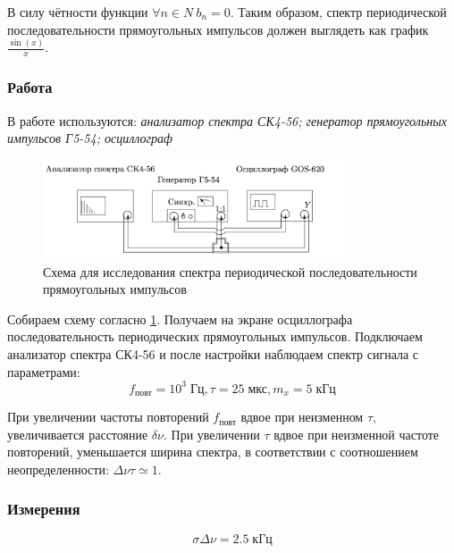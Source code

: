\documentclass[a4paper, 12pt]{article}
\begin{document}
В силу чётности функции $\forall n \in {N} \ b_n=0$. Таким образом, спектр периодической последовательности прямоугольных импульсов должен выглядеть как график $\frac{\sin(x)}{x}$.
\subsubsection*{Работа}
В работе используются: \textit{анализатор спектра СК4-56; генератор прямоугольных импульсов Г5-54; осциллограф}



\begin{figure}[H]
\centering
\includegraphics[width = 0.8\textwidth]{schemeA}
\caption{Схема для исследования спектра периодической последовательности прямоугольных импульсов}
\label{img:scheme A}
\end{figure}

Собираем схему согласно \ref{img:scheme A}. Получаем на экране осциллографа последовательность периодических прямоугольных импульсов. Подключаем анализатор спектра СК4-56 и после настройки наблюдаем спектр сигнала с параметрами: $$f_\text{повт} = 10^3 \; \text{Гц}, \tau = 25 \; \text{мкс}, m_x = 5 \; \text{кГц}$$

При увеличении частоты повторений $f_\text{повт}$ вдвое при неизменном $\tau$, увеличивается расстояние $\delta \nu$. При увеличении $\tau$ вдвое при неизменной частоте повторений, уменьшается ширина спектра, в соответствии с соотношением неопределенности: $\Delta \nu \tau \simeq 1$.

\subsubsection*{Измерения}
$$\sigma \Delta \nu = 2.5 \; \text{кГц}$$
\begin{table}[H]
\centering
{}
\caption{Зависимость ширины $\Delta \nu$ спектра  от длительности импульса $\tau$}
\end{table}
\end{document}
